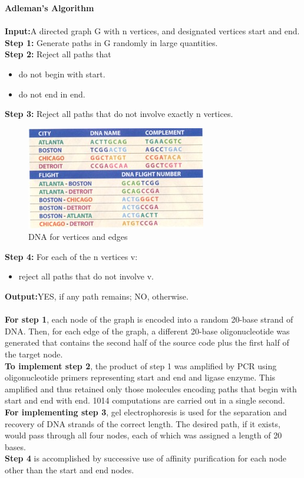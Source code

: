\documentclass[a4paper]{article}
\begin{document}
\textbf{Adleman's Algorithm}
\\ \\ 
\textbf{Input:}A directed graph G with n vertices, and designated vertices start and end.
\\
\textbf{Step 1:} Generate paths in G randomly in large quantities.
\\
\textbf{Step 2:} Reject all paths that 
\begin{itemize}
  \item do not begin with start.  
  \item do not end in end.
\end{itemize}
\textbf{Step 3:} Reject all paths that do not involve exactly n vertices.
\\
\begin{figure}[h!]
    \centering
      \includegraphics[width=0.7\textwidth]{table}
      \caption{DNA for vertices and edges}
  \end{figure}
\textbf{Step 4:} For each of the n vertices v:
\begin{itemize}
  \item reject all paths that do not involve v.
\end{itemize}
\textbf{Output:}YES, if any path remains; NO, otherwise.
\\ \\ 
\textbf{For step 1}, each node of the graph is encoded into a random 20-base strand of DNA. Then, for each edge of the graph, a different 20-base  oligonucleotide  was  generated  that  contains  the  second  half  of  the source code plus the first half of the target node.
\\
\textbf{To implement step 2}, the product of step 1 was amplified by PCR using oligonucleotide  primers  representing start and end  and  ligase  enzyme. This  amplified  and  thus  retained  only  those  molecules  encoding  paths that  begin  with start and  end  with end. 1014  computations  are  carried out in a single second.
\\
\textbf{For   implementing   step   3}, gel   electrophoresis   is used for the  separation and recovery of DNA strands of the correct length. The desired path, if it exists, would pass through all four nodes, each of which was assigned a length of 20 bases.
\\
\textbf{Step  4} is  accomplished  by  successive  use  of  affinity  purification  for each node other than the start and end nodes.
\end{document}
